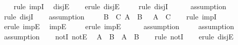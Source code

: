 \begin{isabellebody}
%
\isadelimproof
\ \ %
\endisadelimproof
%
\isatagproof
{}\isamarkupfalse%
\ {\isacharparenleft}{\kern0pt}rule\ impI{\isacharparenright}{\kern0pt}\ \isamarkupfalse%
\ disjE\isanewline
\ \ \isamarkupfalse%
\ {\isacharparenleft}{\kern0pt}erule\ disjE{\isacharparenright}{\kern0pt}\isanewline
\ \ \ \isamarkupfalse%
\ {\isacharparenleft}{\kern0pt}rule\ disjI{}{\isacharparenright}{\kern0pt}\ \isanewline
\ \ \ \isamarkupfalse%
\ assumption\isanewline
\ \ \isamarkupfalse%
\ {\isacharparenleft}{\kern0pt}rule\ disjI{}{\isacharparenright}{\kern0pt}\isanewline
\ \ \isamarkupfalse%
\ assumption\isanewline
\ \ \isamarkupfalse%
%
\endisatagproof
{\isafoldproof}%
%
\isadelimproof
\isanewline
%
\endisadelimproof
\isanewline
{}\isamarkupfalse%
\ {\isachardoublequoteopen}{\isasymlbrakk}\ B\ {\isasymlongrightarrow}\ C{\isacharsemicolon}{\kern0pt}\ A\ {\isasymlongrightarrow}\ B\ {\isasymrbrakk}\ {\isasymLongrightarrow}\ A\ {\isasymlongrightarrow}\ C{\isachardoublequoteclose}\isanewline
%
\isadelimproof
\ \ %
\endisadelimproof
%
\isatagproof
{}\isamarkupfalse%
\ {\isacharparenleft}{\kern0pt}rule\ impI{\isacharparenright}{\kern0pt}\isanewline
\ \ \isamarkupfalse%
\ {\isacharparenleft}{\kern0pt}erule\ impE{\isacharparenright}{\kern0pt}\ \isamarkupfalse%
\ impE\isanewline
\ \ \ \isamarkupfalse%
\ {\isacharparenleft}{\kern0pt}erule\ impE{\isacharparenright}{\kern0pt}\isanewline
\ \ \ \ \isamarkupfalse%
\ assumption\isanewline
\ \ \ \isamarkupfalse%
\ assumption\isanewline
\ \ \isamarkupfalse%
\ assumption\isanewline
\ \ \isamarkupfalse%
%
\endisatagproof
{\isafoldproof}%
%
\isadelimproof
\isanewline
%
\endisadelimproof
\isanewline
{}\isamarkupfalse%
\ notI\ notE\ \isanewline
\isanewline
{}\isamarkupfalse%
\ {\isachardoublequoteopen}{\isasymnot}A\ {\isasymor}\ {\isasymnot}B\ {\isasymLongrightarrow}\ {\isasymnot}{\isacharparenleft}{\kern0pt}A\ {\isasymand}\ B{\isacharparenright}{\kern0pt}{\isachardoublequoteclose}\isanewline
%
\isadelimproof
\ \ %
\endisadelimproof
%
\isatagproof
{}\isamarkupfalse%
\ {\isacharparenleft}{\kern0pt}rule\ notI{\isacharparenright}{\kern0pt}\isanewline
\ \ \isamarkupfalse%
\ {\isacharparenleft}{\kern0pt}erule\ disjE{\isacharparenright}{\kern0pt}\isanewline
\ \ \ \isamarkupfalse%

\end{isabellebody}
